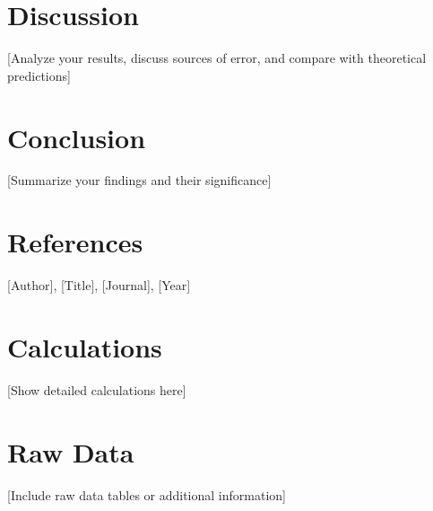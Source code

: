 \documentclass[12pt]{article}
\begin{document}
\section{Discussion}
[Analyze your results, discuss sources of error, and compare with theoretical predictions]

\section{Conclusion}
[Summarize your findings and their significance]

\section{References}
\begin{thebibliography}{9}
     [Author], [Title], [Journal], [Year]
\end{thebibliography}

\appendix
\section{Calculations}
[Show detailed calculations here]

\section{Raw Data}
[Include raw data tables or additional information]
\end{document}
